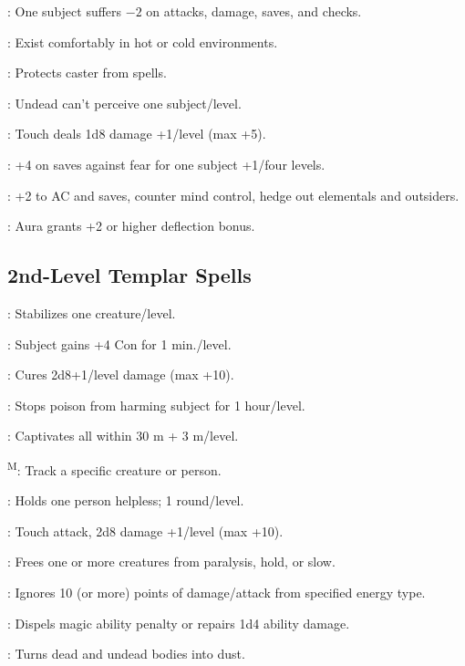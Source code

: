 : One subject suffers $-2$ on attacks, damage, saves, and checks.

: Exist comfortably in hot or cold environments.

: Protects caster from spells.

: Undead can't perceive one subject/level.

: Touch deals 1d8 damage +1/level (max +5).

: +4 on saves against fear for one subject +1/four levels.

: +2 to AC and saves, counter mind control, hedge out elementals and outsiders.

: Aura grants +2 or higher deflection bonus.



\subsection{2nd-Level Templar Spells}

: Stabilizes one creature/level.

: Subject gains +4 Con for 1 min./level.

: Cures 2d8+1/level damage (max +10).

: Stops poison from harming subject for 1 hour/level.

: Captivates all within 30 m + 3 m/level.

\textsuperscript{M}: Track a specific creature or person.

: Holds one person helpless; 1 round/level.

: Touch attack, 2d8 damage +1/level (max +10).

: Frees one or more creatures from paralysis, hold, or slow.

: Ignores 10 (or more) points of damage/attack from specified energy type.

: Dispels magic ability penalty or repairs 1d4 ability damage.

: Turns dead and undead bodies into dust.

